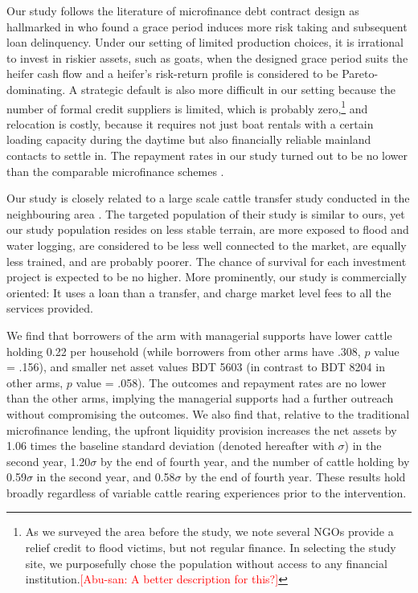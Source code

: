 	Our study follows the literature of microfinance debt contract design as hallmarked in \citet{Field2013} who found a grace period induces more risk taking and subsequent loan delinquency. Under our setting of limited production choices, it is irrational to invest in riskier assets, such as goats, when the designed grace period suits the heifer cash flow and a heifer's risk-return profile is considered to be Pareto-dominating. A strategic default is also more difficult in our setting because the number of formal credit suppliers is limited, which is probably zero,\footnote{As we surveyed the area before the study, we note several NGOs provide a relief credit to flood victims, but not regular finance. In selecting the study site, we purposefully chose the population without access to any financial institution.\textcolor{red}{[Abu-san: A better description for this?]} } and relocation is costly, because it requires not just boat rentals with a certain loading capacity during the daytime but also financially reliable mainland contacts to settle in. The repayment rates in our study turned out to be no lower than the comparable microfinance schemes \citep{BanerjeeKarlanZinman2015}.

	Our study is closely related to a large scale cattle transfer study conducted in the neighbouring area \citep{BandieraBRAC2017, Balboni2020}. The targeted population of their study is similar to ours, yet our study population resides on less stable terrain, are more exposed to flood and water logging, are considered to be less well connected to the market, are equally less trained, and are probably poorer. The chance of survival for each investment project is expected to be no higher. More prominently, our study is commercially oriented: It uses a loan than a transfer, and charge market level fees to all the services provided. 
	



	We find that borrowers of the arm with managerial supports have lower cattle holding 0.22 per household (while borrowers from other arms have .308, $p$ value = .156), and smaller net asset values BDT 5603 (in contrast to BDT 8204 in other arms, $p$ value = .058). The outcomes and repayment rates are no lower than the other arms, implying the managerial supports had a further outreach without compromising the outcomes. We also find that, relative to the traditional microfinance lending, the upfront liquidity provision increases the net assets by 
	1.06 times the baseline standard deviation (denoted hereafter with $\sigma$) in the second year, 
	1.20$\sigma$ by the end of fourth year, 
	and the number of cattle holding by 0.59$\sigma$ in the second year, and 
	0.58$\sigma$ by the end of fourth year. 
	These results hold broadly regardless of variable cattle rearing experiences prior to the intervention.

